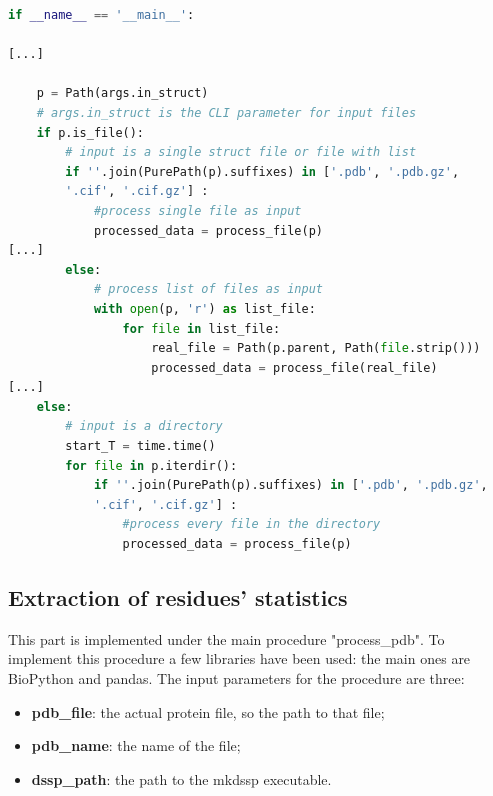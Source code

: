 \begin{lstlisting}[language=Python, caption=Input\ files\ parsing]
if __name__ == '__main__':
    
[...]
    
    p = Path(args.in_struct)
    # args.in_struct is the CLI parameter for input files
    if p.is_file():
        # input is a single struct file or file with list
        if ''.join(PurePath(p).suffixes) in ['.pdb', '.pdb.gz', 
        '.cif', '.cif.gz'] :
            #process single file as input
            processed_data = process_file(p)
[...]
        else:
            # process list of files as input 
            with open(p, 'r') as list_file:
                for file in list_file:
                    real_file = Path(p.parent, Path(file.strip()))
                    processed_data = process_file(real_file)
[...]
    else:
        # input is a directory
        start_T = time.time()
        for file in p.iterdir():
            if ''.join(PurePath(p).suffixes) in ['.pdb', '.pdb.gz',
            '.cif', '.cif.gz'] :
                #process every file in the directory
                processed_data = process_file(p)
\end{lstlisting}


\subsection{Extraction of residues' statistics}

This part is implemented under the main procedure "process\_pdb". To implement this procedure a few libraries have been used: the main ones are BioPython and pandas. The input parameters for the procedure are three:
\begin{itemize}
    \item \textbf{pdb\_file}: the actual protein file, so the path to that file;
    \item \textbf{pdb\_name}: the name of the file;
    \item \textbf{dssp\_path}: the path to the mkdssp executable.
\end{itemize}
